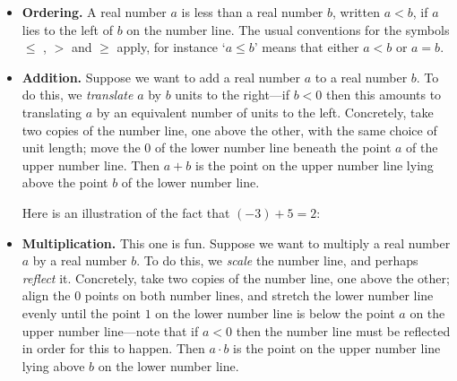\begin{itemize}
\item \textbf{Ordering.} A real number $a$ is less than a real number $b$, written $a<b$, if $a$ lies to the left of $b$ on the number line. The usual conventions for the symbols $\le$ , $>$ and $\ge$  apply, for instance `$a \le b$' means that either $a < b$ or $a = b$.

\item \textbf{Addition.} Suppose we want to add a real number $a$ to a real number $b$. To do this, we \textit{translate} $a$ by $b$ units to the right---if $b<0$ then this amounts to translating $a$ by an equivalent number of units to the left. Concretely, take two copies of the number line, one above the other, with the same choice of unit length; move the $0$ of the lower number line beneath the point $a$ of the upper number line. Then $a+b$ is the point on the upper number line lying above the point $b$ of the lower number line.

Here is an illustration of the fact that $(-3) + 5 = 2$:

\begin{center}
\end{center}

\item \textbf{Multiplication.} This one is fun. Suppose we want to multiply a real number $a$ by a real number $b$. To do this, we \textit{scale} the number line, and perhaps \textit{reflect} it. Concretely, take two copies of the number line, one above the other; align the $0$ points on both number lines, and stretch the lower number line evenly until the point $1$ on the lower number line is below the point $a$ on the upper number line---note that if $a<0$ then the number line must be reflected in order for this to happen. Then $a \cdot b$ is the point on the upper number line lying above $b$ on the lower number line.


\end{itemize}
